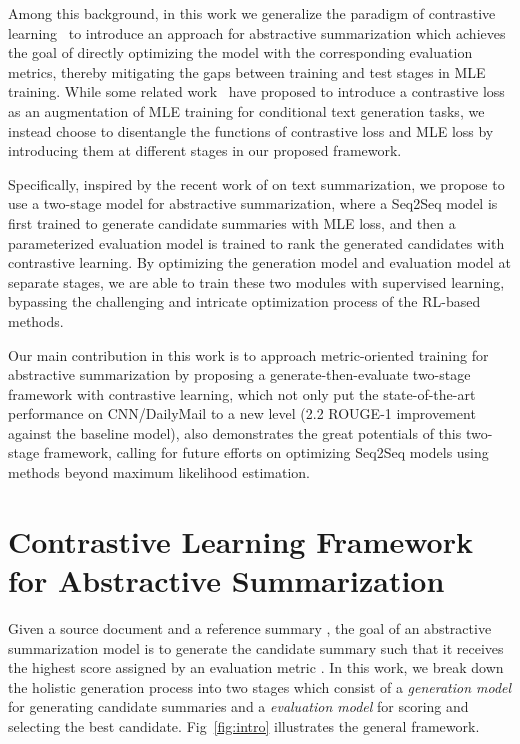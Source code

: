 \documentclass[11pt,a4paper]{article}
\begin{document}
Among this background, in this work we generalize the paradigm of contrastive learning~\citep{chopra2005learning} to introduce an approach for abstractive summarization which achieves the goal of directly optimizing the model with the corresponding evaluation metrics, thereby mitigating the gaps between training and test stages in MLE training.
While some related work~\citep{lee2021contrastive, pan2021contrastive} have proposed to introduce a contrastive loss as an augmentation of MLE training for conditional text generation tasks, we instead choose to disentangle the functions of contrastive loss and MLE loss by introducing them at different stages in our proposed framework.

Specifically, inspired by the recent work of \citet{zhong-etal-2020-extractive, liu-etal-2021-refsum} on text summarization, we propose to use a two-stage model for abstractive summarization, where a Seq2Seq model is first trained to generate candidate summaries with MLE loss, and then a parameterized evaluation model is trained to rank the generated candidates with contrastive learning.
By optimizing the generation model and evaluation model at separate stages, we are able to train these two modules with supervised learning, bypassing the challenging and intricate optimization process of the RL-based methods.

Our main contribution in this work is to approach metric-oriented training for abstractive summarization by proposing a generate-then-evaluate two-stage framework with contrastive learning, which not only put the state-of-the-art performance on CNN/DailyMail to a new level (2.2 ROUGE-1 improvement against the baseline model), also demonstrates the great potentials of this two-stage framework, calling for future efforts on optimizing Seq2Seq models using methods beyond maximum likelihood estimation.

\section{Contrastive Learning Framework for Abstractive Summarization}

Given a source document  and a reference summary , the goal of an abstractive summarization model  is to generate the candidate summary  such that it receives the highest score  assigned by an evaluation metric .
In this work, we break down the holistic generation process into two stages which consist of a \textit{generation model}  for generating candidate summaries and a \textit{evaluation model}  for scoring and selecting the best candidate. 
Fig~\ref{fig:intro} illustrates the general framework.
\end{document}
